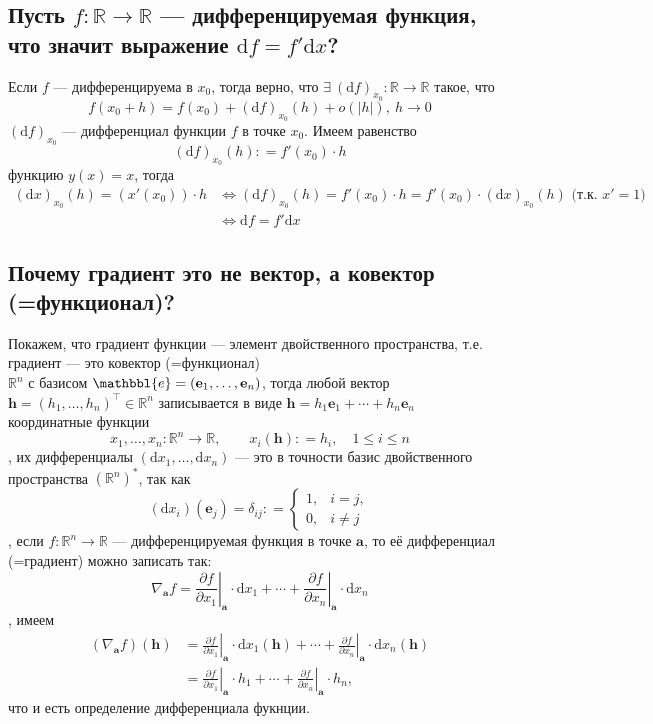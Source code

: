 \documentclass[a4paper]{article}
\newcommand{\e}{\mathbbl{e}}
\newcommand{\m}[1]{\mathbf{#1}}
\begin{document}
\subsection{Пусть $f:\mathbb{R}\rightarrow\mathbb{R}$ — дифференцируемая функция, что значит выражение $\mathrm{d}f=f'\mathrm{d}x$?}
\label{1.4}
Если $f$ — дифференцируема в $x_0$, тогда верно, что $\exists\ (\mathrm{d}f)_{x_0}:\mathbb{R}\rightarrow\mathbb{R}$ такое, что
$$f(x_0+h)=f(x_0)+(\mathrm{d}f)_{x_0}(h)+o(\left|h\right|),\ h\rightarrow0$$
\indent $(\mathrm{d}f)_{x_0}$ — дифференциал функции $f$ в точке $x_0$. Имеем равенство
$$(\mathrm{d}f)_{x_0}(h): = f'(x_0)\cdot h$$
 функцию $y(x)=x$, тогда
$$\begin{aligned}
    (\mathrm{d}x)_{x_0}(h) = (x'(x_0))\cdot h&\Longleftrightarrow(\mathrm{d}f)_{x_0}(h) = f'(x_0) \cdot h = f'(x_0) \cdot  (\mathrm{d}x)_{x_0}(h)\text{ (т.к. }x'=1)\\
    &\Longleftrightarrow\boxed{\mathrm{d}f=f'\mathrm{d}x}
\end{aligned}$$

\subsection{Почему градиент это не вектор, а ковектор (=функционал)?}
Покажем, что градиент функции — элемент двойственного пространства, т.е. градиент — это ковектор (=функционал)\\[2mm]
 $\mathbb{R}^n$ с базисом $\e = (\m{e}_1,\ldots, \m{e}_n)$, тогда любой вектор $\m{h} = (h_1,\ldots, h_n)^\top  \in \mathbb{R}^n$ записывается в виде $\m{h} = h_1\m{e}_1 + \cdots + h_n \m{e}_n$\\[2mm]
 координатные функции 
$$
x_1,\ldots, x_n:\mathbb{R}^n \to \mathbb{R}, \qquad x_i(\m{h}): = h_i, \quad 1 \leqslant i \leqslant n
$$
, их дифференциалы $(\mathrm{d}x_1, \ldots, \mathrm{d}x_n)$ — это в точности базис двойственного пространства $(\mathbb{R}^n)^*$, так как
$$
(\mathrm{d}x_i)(\m{e}_j) = \delta_{ij}: = \begin{cases}
1, & i = j, \\
0, & i \ne j
\end{cases}
$$
, если $f:\mathbb{R}^n \to \mathbb{R}$ — дифференцируемая функция в точке $\m{a}$, то её дифференциал (=градиент) можно записать так:
$$
\boxed{
\nabla_\m{a} f = \left.\frac{\partial f}{\partial x_1}\right|_\m{a} \cdot \mathrm{d}x_1 + \cdots +  \left.\frac{\partial f}{\partial x_n}\right|_\m{a} \cdot \mathrm{d}x_n
}    
$$
, имеем\\
$$\begin{aligned}
(\nabla_\m{a} f) (\m{h}) &= \left.\frac{\partial f}{\partial x_1}\right|_\m{a} \cdot \mathrm{d}x_1(\m{h}) + \cdots +  \left.\frac{\partial f}{\partial x_n}\right|_\m{a} \cdot \mathrm{d}x_n (\m{h}) \\
&= \left.\frac{\partial f}{\partial x_1}\right|_\m{a} \cdot h_1 + \cdots +  \left.\frac{\partial f}{\partial x_n}\right|_\m{a} \cdot h_n ,
\end{aligned}$$
что и есть определение дифференциала фукнции.
\end{document}
